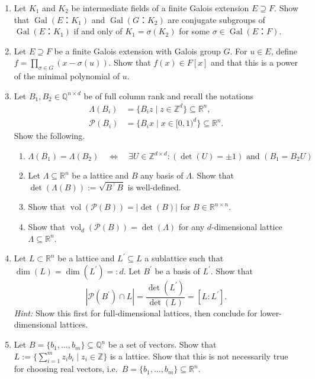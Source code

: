 \documentclass[12pt,a4paper]{article}
\def \R {\mathbb R}
\def \Q {\mathbb Q}
\def \Z {\mathbb Z}
\DeclareMathOperator{\vol}{vol}
\DeclareMathOperator{\gal}{Gal}
\begin{document}
 
\begin{enumerate}
\item 
  Let $K_1$ and $K_2$ be intermediate fields of a finite Galois extension $E ⊇F$. Show that $\gal(E：K_1)$ and $\gal(G：K_2)$ are conjugate subgroups of $\gal(E：K_1)$ if and only of $K_1 = σ(K_2)$ for some $σ ∈ \gal(E：F)$.
\item Let $E ⊇F$ be a finite Galois extension with Galois group $G$. For $u ∈E$, define $f = ∏_{σ ∈G} (x - σ(u))$. Show that $f(x) ∈F[x]$ and that this is a power of the minimal polynomial of $u$.

\item Let $B_1, B_2 \in \Q^{n \times d}$ be of full column rank and recall the notations
\begin{align*}
\Lambda(B_i) &= \{ B_i z \mid z \in \Z^d\} \subseteq \R^n, \\
\mathcal{P}(B_i) &= \{B_i x \mid x \in [0,1)^d\} \subseteq \R^n.
\end{align*}
Show the following.
\begin{enumerate}
\item
\[
\Lambda (B_1) = \Lambda (B_2) \quad \Leftrightarrow \quad \exists U \in \Z^{d \times d}: (\det(U) = \pm 1) \text{ and } (B_1 = B_2 U)
\]
\item Let $\Lambda \subseteq \R^n$ be a lattice and $B$ any basis of $\Lambda$.
Show that $\det (\Lambda(B)) := \sqrt{B^\intercal B}$ is well-defined.
\item Show that $\vol(\mathcal{P}(B)) = | \det (B) |$ for $B \in \R^{n \times n}$.
\item Show that $\vol_d(\mathcal{P}(B)) = \det (\Lambda)$ for any $d$-dimensional lattice $\Lambda \subseteq \R^n$.
\end{enumerate}
\item Let $L \subset \R^n$ be a lattice and $L^\prime \subseteq L$ a sublattice such that $\dim(L) = \dim(L^\prime) =: d$.
Let $B^\prime$ be a basis of $L^\prime$.
Show that
\[
 | \mathcal{P}(B^\prime) \cap L | = \frac{\det(L^\prime)}{\det (L)} = [L : L^\prime].
\]
\textit{Hint:} Show this first for full-dimensional lattices, then conclude for lower-dimensional lattices.
\item Let $B = \{ b_1,\dots,b_m\} \subseteq \Q^n$ be a set of vectors.
Show that $L := \{\sum_{i=1}^m z_i b_i \mid z_i \in \Z \}$ is a lattice.
Show that this is not necessarily true for choosing real vectors, i.e.\ $B = \{b_1,\dots,b_m\} \subseteq \R^n$. 


\end{enumerate}
\end{document}
